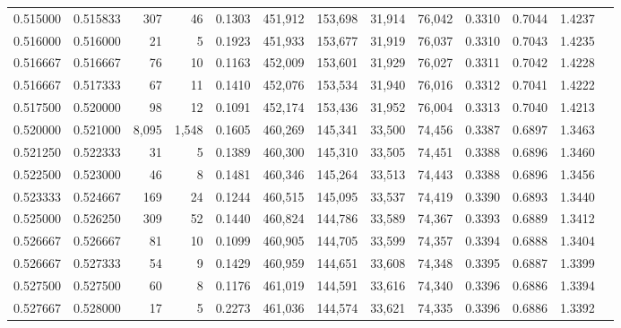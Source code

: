\begin{tabular}{rrrrrrrrrrrrr}
0.515000 & 0.515833 &    307 &    46 &                                     0.1303 & 451,912 & 153,698 &  31,914 &  76,042 & 0.3310 & 0.7044 & 1.4237 \\
0.516000 & 0.516000 &     21 &     5 &                                     0.1923 & 451,933 & 153,677 &  31,919 &  76,037 & 0.3310 & 0.7043 & 1.4235 \\
0.516667 & 0.516667 &     76 &    10 &                                     0.1163 & 452,009 & 153,601 &  31,929 &  76,027 & 0.3311 & 0.7042 & 1.4228 \\
0.516667 & 0.517333 &     67 &    11 &                                     0.1410 & 452,076 & 153,534 &  31,940 &  76,016 & 0.3312 & 0.7041 & 1.4222 \\
0.517500 & 0.520000 &     98 &    12 &                                     0.1091 & 452,174 & 153,436 &  31,952 &  76,004 & 0.3313 & 0.7040 & 1.4213 \\
0.520000 & 0.521000 &  8,095 & 1,548 &                                     0.1605 & 460,269 & 145,341 &  33,500 &  74,456 & 0.3387 & 0.6897 & 1.3463 \\
0.521250 & 0.522333 &     31 &     5 &                                     0.1389 & 460,300 & 145,310 &  33,505 &  74,451 & 0.3388 & 0.6896 & 1.3460 \\
0.522500 & 0.523000 &     46 &     8 &                                     0.1481 & 460,346 & 145,264 &  33,513 &  74,443 & 0.3388 & 0.6896 & 1.3456 \\
0.523333 & 0.524667 &    169 &    24 &                                     0.1244 & 460,515 & 145,095 &  33,537 &  74,419 & 0.3390 & 0.6893 & 1.3440 \\
0.525000 & 0.526250 &    309 &    52 &                                     0.1440 & 460,824 & 144,786 &  33,589 &  74,367 & 0.3393 & 0.6889 & 1.3412 \\
0.526667 & 0.526667 &     81 &    10 &                                     0.1099 & 460,905 & 144,705 &  33,599 &  74,357 & 0.3394 & 0.6888 & 1.3404 \\
0.526667 & 0.527333 &     54 &     9 &                                     0.1429 & 460,959 & 144,651 &  33,608 &  74,348 & 0.3395 & 0.6887 & 1.3399 \\
0.527500 & 0.527500 &     60 &     8 &                                     0.1176 & 461,019 & 144,591 &  33,616 &  74,340 & 0.3396 & 0.6886 & 1.3394 \\
0.527667 & 0.528000 &     17 &     5 &                                     0.2273 & 461,036 & 144,574 &  33,621 &  74,335 & 0.3396 & 0.6886 & 1.3392 \\

\end{tabular}
